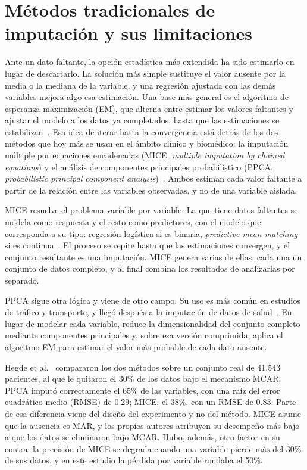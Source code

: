 \documentclass{report}
\begin{document}
\section{Métodos tradicionales de imputación y sus limitaciones}
\label{sec:metodos_imputacion_tradicional}

Ante un dato faltante, la opción estadística más extendida ha sido estimarlo en lugar de descartarlo. La solución más simple sustituye el valor ausente por la media o la mediana de la variable, y una regresión ajustada con las demás variables mejora algo esa estimación. Una base más general es el algoritmo de esperanza-maximización (EM), que alterna entre estimar los valores faltantes y ajustar el modelo a los datos ya completados, hasta que las estimaciones se estabilizan~\cite{sun2023deep}. Esa idea de iterar hasta la convergencia está detrás de los dos métodos que hoy más se usan en el ámbito clínico y biomédico: la imputación múltiple por ecuaciones encadenadas (MICE, \textit{multiple imputation by chained equations}) y el análisis de componentes principales probabilístico (PPCA, \textit{probabilistic principal component analysis})~\cite{hegde2019mice, zhang2016multiple}. Ambos estiman cada valor faltante a partir de la relación entre las variables observadas, y no de una variable aislada.

MICE resuelve el problema variable por variable. La que tiene datos faltantes se modela como respuesta y el resto como predictores, con el modelo que corresponda a su tipo: regresión logística si es binaria, \textit{predictive mean matching} si es continua~\cite{zhang2016multiple}. El proceso se repite hasta que las estimaciones convergen, y el conjunto resultante es una imputación. MICE genera varias de ellas, cada una un conjunto de datos completo, y al final combina los resultados de analizarlas por separado.

PPCA sigue otra lógica y viene de otro campo. Su uso es más común en estudios de tráfico y transporte, y llegó después a la imputación de datos de salud~\cite{hegde2019mice}. En lugar de modelar cada variable, reduce la dimensionalidad del conjunto completo mediante componentes principales y, sobre esa versión comprimida, aplica el algoritmo EM para estimar el valor más probable de cada dato ausente.

Hegde et al.~\cite{hegde2019mice} compararon los dos métodos sobre un conjunto real de 41{,}543 pacientes, al que le quitaron el 30\% de los datos bajo el mecanismo MCAR. PPCA imputó correctamente el 65\% de las variables, con una raíz del error cuadrático medio (RMSE) de 0.29; MICE, el 38\%, con un RMSE de 0.83. Parte de esa diferencia viene del diseño del experimento y no del método. MICE asume que la ausencia es MAR, y los propios autores atribuyen su desempeño más bajo a que los datos se eliminaron bajo MCAR. Hubo, además, otro factor en su contra: la precisión de MICE se degrada cuando una variable pierde más del 30\% de sus datos, y en este estudio la pérdida por variable rondaba el 50\%.
\end{document}
